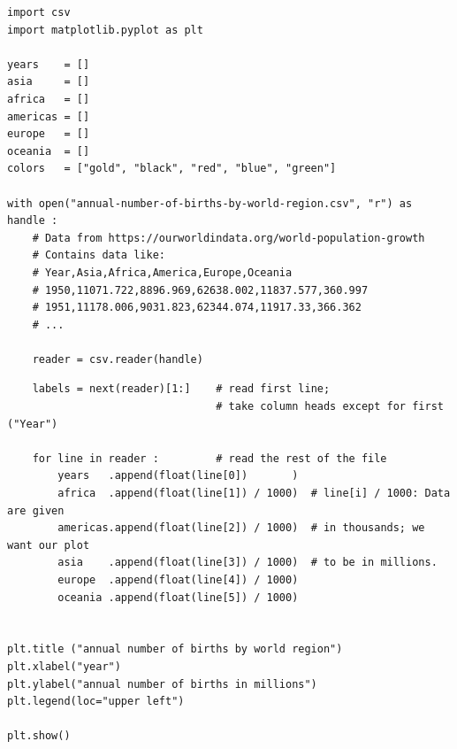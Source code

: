 
\begin{frame}[fragile]
%
\begin{codebox}
\begin{verbatim}
import csv
import matplotlib.pyplot as plt

years    = []
asia     = []
africa   = []
americas = []
europe   = []
oceania  = []
colors   = ["gold", "black", "red", "blue", "green"]

with open("annual-number-of-births-by-world-region.csv", "r") as handle :
    # Data from https://ourworldindata.org/world-population-growth
    # Contains data like:
    # Year,Asia,Africa,America,Europe,Oceania
    # 1950,11071.722,8896.969,62638.002,11837.577,360.997
    # 1951,11178.006,9031.823,62344.074,11917.33,366.362
    # ...
      
    reader = csv.reader(handle)

\end{verbatim}
\end{codebox}
%
\end{frame}


\begin{frame}[fragile]
%
\begin{codebox}[... continued]
\begin{verbatim}
    labels = next(reader)[1:]    # read first line;
                                 # take column heads except for first ("Year")

    for line in reader :         # read the rest of the file
        years   .append(float(line[0])       )
        africa  .append(float(line[1]) / 1000)  # line[i] / 1000: Data are given
        americas.append(float(line[2]) / 1000)  # in thousands; we want our plot
        asia    .append(float(line[3]) / 1000)  # to be in millions.
        europe  .append(float(line[4]) / 1000)
        oceania .append(float(line[5]) / 1000)


plt.title ("annual number of births by world region")
plt.xlabel("year")
plt.ylabel("annual number of births in millions")
plt.legend(loc="upper left")

plt.show()
\end{verbatim}
\end{codebox}
%
\end{frame}

